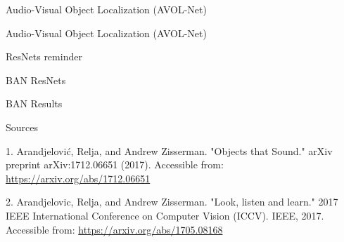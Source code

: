 \documentclass{beamer}
\begin{document}
\begin{frame}{Audio-Visual Object Localization (AVOL-Net)}


\end{frame}
\begin{frame}{Audio-Visual Object Localization (AVOL-Net)}



\end{frame}
\begin{frame}{ResNets reminder}

\end{frame}
\begin{frame}{BAN ResNets}

\end{frame}
\begin{frame}{BAN Results}


\end{frame}

\begin{frame}{Sources}

\begin{thebibliography}{0}

   1. Arandjelović, Relja, and Andrew Zisserman. "Objects that Sound." arXiv preprint arXiv:1712.06651 (2017). Accessible from: \url{https://arxiv.org/abs/1712.06651}
  
   2. Arandjelovic, Relja, and Andrew Zisserman. "Look, listen and learn." 2017 IEEE International Conference on Computer Vision (ICCV). IEEE, 2017. Accessible from: \url{https://arxiv.org/abs/1705.08168}
\end{thebibliography}
\end{frame}
 
 
 
\end{document}
